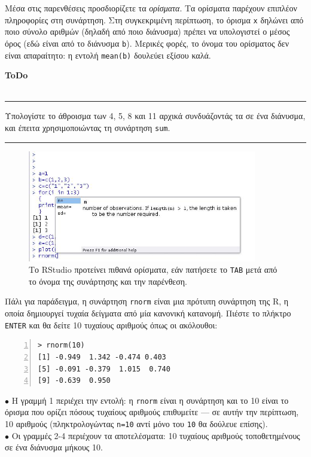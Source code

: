 \documentclass[a4paper,10pt,twocolumn]{article}
\newenvironment{ToDo} {
  \begin{flushright}
    \hfill
    \begin{minipage}{0.9\columnwidth}
    \textsf{\textbf{ToDo}} \\
      \vspace{-0.7cm}\\
      {\color{Gray}\rule[-0.05cm]{\columnwidth}{1.5pt}}} {
      {\color{Gray}\rule[0.3cm]{\columnwidth}{1.5pt}}
    \end{minipage}
    \vspace{0.3cm}
  \end{flushright}
  }
\begin{document}
Μέσα στις παρενθέσεις προσδιορίζετε τα \emph{ορίσματα}. Τα ορίσματα παρέχουν επιπλέον πληροφορίες στη 
συνάρτηση. Στη συγκεκριμένη περίπτωση, το όρισμα \texttt{x} δηλώνει από ποιο σύνολο αριθμών (δηλαδή από ποιο
διάνυσμα) πρέπει να υπολογιστεί ο μέσος όρος (εδώ είναι από το διάνυσμα \texttt{b}). Μερικές φορές, το όνομα
του ορίσματος δεν είναι απαραίτητο: η εντολή \texttt{mean(b)} δουλεύει εξίσου καλά.

\begin{ToDo}
Υπολογίστε το άθροισμα των 4, 5, 8 και 11 αρχικά συνδυάζοντάς τα σε ένα διάνυσμα, και έπειτα χρησιμοποιώντας
τη συνάρτηση \texttt{sum}.\\
\end{ToDo}

\begin{figure}[htb]
  \centering
  \includegraphics[width=10cm, clip=true, trim=0cm 0cm 0cm 1cm]{img/tab_RStudio.jpg}
  \caption{Το RStudio προτείνει πιθανά ορίσματα, εάν πατήσετε το \texttt{TAB} μετά από το όνομα της συνάρτησης
  και την παρένθεση.}
  \label{fig:tab_RStudio}
\end{figure}

Πάλι για παράδειγμα, η συνάρτηση \texttt{rnorm} είναι μια πρότυπη συνάρτηση της R, η οποία δημιουργεί
τυχαία δείγματα από μία κανονική κατανομή. Πιέστε το πλήκτρο \texttt{ENTER} και θα δείτε 10 τυχαίους αριθμούς
όπως οι ακόλουθοι:

\begin{Verbatim}[frame=single,numbers=left,gobble=0, xleftmargin=0.35cm, numbersep=0.1cm]
> rnorm(10)
[1] -0.949  1.342 -0.474 0.403 
[5] -0.091 -0.379  1.015  0.740 
[9] -0.639  0.950
\end{Verbatim}

\noindent $\bullet$ Η γραμμή 1 περιέχει την εντολή: η \texttt{rnorm} είναι η συνάρτηση και το 10 είναι το όρισμα
που ορίζει πόσους τυχαίους αριθμούς επιθυμείτε --- σε αυτήν την περίπτωση, 10 αριθμούς (πληκτρολογώντας
\texttt{n=10} αντί μόνο του \texttt{10} θα δούλευε επίσης).\\
\noindent $\bullet$ Οι γραμμές 2-4 περιέχουν τα αποτελέσματα: 10 τυχαίους αριθμούς τοποθετημένους σε ένα
διάνυσμα μήκους 10.
\end{document}
